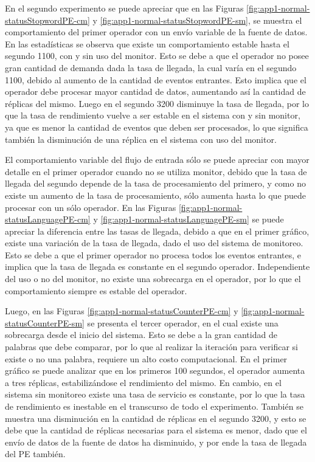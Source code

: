 En el segundo experimento se puede apreciar que en las Figuras \ref{fig:app1-normal-statusStopwordPE-cm} y \ref{fig:app1-normal-statusStopwordPE-sm}, se muestra el comportamiento del primer operador con un envío variable de la fuente de datos. En las estadísticas se observa que existe un comportamiento estable hasta el segundo 1100, con y sin uso del monitor. Esto se debe a que el operador no posee gran cantidad de demanda dada la tasa de llegada, la cual varía en el segundo 1100, debido al aumento de la cantidad de eventos entrantes. Esto implica que el operador debe procesar mayor cantidad de datos, aumentando así la cantidad de réplicas del mismo. Luego en el segundo 3200 disminuye la tasa de llegada, por lo que la tasa de rendimiento vuelve a ser estable en el sistema con y sin monitor, ya que es menor la cantidad de eventos que deben ser procesados, lo que significa también la disminución de una réplica en el sistema con uso del monitor.

El comportamiento variable del flujo de entrada sólo se puede apreciar con mayor detalle en el primer operador cuando no se utiliza monitor, debido que la tasa de llegada del segundo depende de la tasa de procesamiento del primero, y como no existe un aumento de la tasa de procesamiento, sólo aumenta hasta lo que puede procesar con un sólo operador. En las Figuras \ref{fig:app1-normal-statusLanguagePE-cm} y \ref{fig:app1-normal-statusLanguagePE-sm} se puede apreciar la diferencia entre las tasas de llegada, debido a que en el primer gráfico, existe una variación de la tasa de llegada, dado el uso del sistema de monitoreo. Esto se debe a que el primer operador no procesa todos los eventos entrantes, e implica que la tasa de llegada es constante en el segundo operador. Independiente del uso o no del monitor, no existe una sobrecarga en el operador, por lo que el comportamiento siempre es estable del operador.

Luego, en las Figuras \ref{fig:app1-normal-statusCounterPE-cm} y \ref{fig:app1-normal-statusCounterPE-sm} se presenta el tercer operador, en el cual existe una sobrecarga desde el inicio del sistema. Esto se debe a la gran cantidad de palabras que debe comparar, por lo que al realizar la iteración para verificar si existe o no una palabra, requiere un alto costo computacional. En el primer gráfico se puede analizar que en los primeros 100 segundos, el operador aumenta a tres réplicas, estabilizándose el rendimiento del mismo. En cambio, en el sistema sin monitoreo existe una tasa de servicio es constante, por lo que la tasa de rendimiento es inestable en el transcurso de todo el experimento. También se muestra una disminución en la cantidad de réplicas en el segundo 3200, y esto se debe que la cantidad de réplicas necesarias para el sistema es menor, dado que el envío de datos de la fuente de datos ha disminuido, y por ende la tasa de llegada del PE también.

